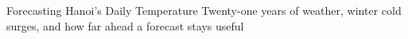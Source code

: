 \documentclass[11pt,a4paper]{article}
\begin{document}
  {Forecasting Hanoi's Daily Temperature}
  {Twenty-one years of weather, winter cold surges, and how far ahead a forecast stays useful}
  {\TSLinks}
\tableofcontents

\end{document}
